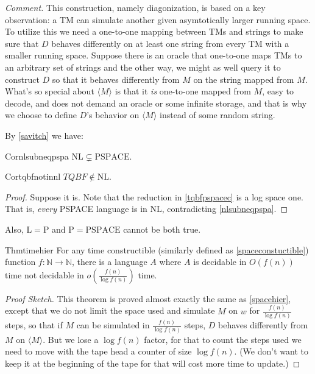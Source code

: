 \textit{Comment.} This construction, namely diagonization, is based on a key observation: a TM can simulate another given asymtotically larger running space. To utilize this we need a one-to-one mapping between TMs and strings to make sure that $D$ behaves differently on at least one string from every TM with a smaller running space. Suppose there is an oracle that one-to-one maps TMs to an arbitrary set of strings and the other way, we might as well query it to construct $D$ so that it behaves differently from $M$ on the string mapped from $M$. What's so special about $\langle M\rangle$ is that it \textit{is} one-to-one mapped from $M$, easy to decode, and does not demand an oracle or some infinite storage, and that is why we choose to define $D$'s behavior on $\langle M\rangle$ instead of some random string.


By \ref{savitch} we have:

\begin{reference}{Cor}{nlsubneqpspa}
  $\mathrm{NL}\subsetneq \mathrm{PSPACE.}$
\end{reference}

\begin{reference}{Cor}{tqbfnotinnl}
  $\textit{TQBF}\notin \mathrm{NL}$.
\end{reference}

\begin{proof}
  Suppose it is. Note that the reduction in \ref{tqbfpspacec} is a log space one. That is, \textit{every} PSPACE language is in $\mathrm{NL}$, contradicting \ref{nlsubneqpspa}.
\end{proof}

Also, $\mathrm{L}=\mathrm{P}$ and $\mathrm{P}=\mathrm{PSPACE}$ cannot be both true.

\begin{reference}{Thm}{timehier}
  For any time constructible (similarly defined as \ref{spaceconstuctible}) function $f:\mathbb N\to \mathbb N$, there is a language $A$ where $A$ is decidable in $O(f(n))$ time not decidable in $o(\frac{f(n)}{\log f(n)})$ time.
\end{reference}

\begin{proof}[Proof Sketch]
  This theorem is proved almost exactly the same as \ref{spacehier}, except that we do not limit the space used and simulate $M$ on $w$ for $\frac{f(n)}{\log f(n)}$ steps, so that if $M$ can be simulated in $\frac{f(n)}{\log f(n)}$ steps, $D$ behaves differently from $M$ on $\langle M\rangle$. But we lose a $\log f(n)$ factor, for that to count the steps used we need to move with the tape head a counter of size $\log f(n)$. (We don't want to keep it at the beginning of the tape for that will cost more time to update.)
\end{proof}

